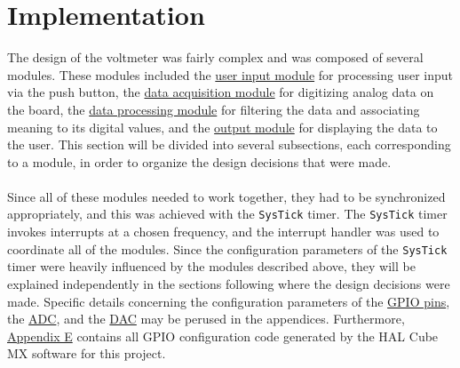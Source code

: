 \documentclass[12pt]{report}
\begin{document}
\section{Implementation}
The design of the voltmeter was fairly complex and was composed of several modules.
These modules included the \hyperref[userinput]{user input module} for processing user input via the
push button, the \hyperref[dataaq]{data
acquisition module} for digitizing analog data on the board, the \hyperref[dataproc]{data processing
module} for filtering
the data and associating meaning to its digital values, and the \hyperref[output]{output module} for
displaying the
data to the user. This section will be divided into several subsections, each corresponding to a
module, in order to organize the design decisions that were made.\\\\
Since all of these modules needed to work together, they had to be synchronized
appropriately, and this was achieved with the \texttt{SysTick} timer. The \texttt{SysTick} timer
invokes interrupts at a chosen frequency, and the interrupt handler was used to coordinate all of
the modules. Since the configuration parameters of the \texttt{SysTick} timer were heavily
influenced by the modules described above, they will be explained independently in the sections
following where the design decisions were made. Specific details concerning the configuration
parameters of the \hyperref[appendixgpio]{GPIO pins}, the \hyperref[appendixadc]{ADC}, and the
\hyperref[appendixdac]{DAC} may be perused in the appendices. Furthermore,
\hyperref[mammoth]{Appendix E} contains all GPIO configuration code generated by the HAL Cube MX
software for this project.
\end{document}
